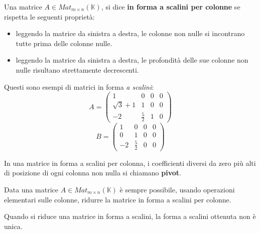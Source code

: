 \begin{defn}
	Una matrice $A \in Mat_{m \times n}(\mathbb{K})$, si dice
	\textbf{in forma a scalini per colonne} se rispetta le seguenti propriet\`a:
	\begin{itemize}
		\item leggendo la matrice da sinistra a destra, le colonne non nulle si
		      incontrano tutte prima delle colonne nulle.
		\item leggendo la matrice da sinistra a destra, le profondit\`a
		      delle sue colonne non nulle risultano strettamente
		      decrescenti.
	\end{itemize}
\end{defn}

\begin{example}
	Questi sono esempi di matrici in forma \emph{a scalini}:
	\begin{equation*}
		A = \begin{pmatrix}
			1            & 0           & 0 & 0 \\
			\sqrt{3} + 1 & 1           & 0 & 0 \\
			-2           & \frac{5}{2} & 1 & 0
		\end{pmatrix}
	\end{equation*}
	\begin{equation*}
		B = \begin{pmatrix}
			1  & 0           & 0 & 0 \\
			0  & 1           & 0 & 0 \\
			-2 & \frac{5}{2} & 0 & 0
		\end{pmatrix}
	\end{equation*}
\end{example}

\begin{defn}
	In una matrice in forma a scalini per colonna, i coefficienti diversi
	da zero pi\`u alti di posizione di ogni colonna non nulla si
	chiamano \textbf{pivot}.
\end{defn}

\begin{theorem}
	Data una matrice $A \in Mat_{m \times n}(\mathbb{K})$ \`e sempre
	possibile, usando operazioni elementari sulle colonne, ridurre la
	matrice in forma a scalini per colonne.
\end{theorem}

\begin{observation}
	Quando si riduce una matrice in forma a scalini, la forma a scalini
	ottenuta non \`e unica.
\end{observation}


